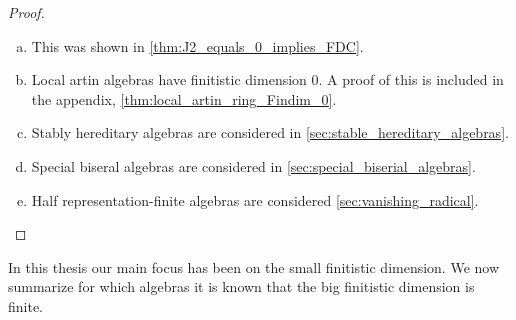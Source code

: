 \begin{theorem}
\begin{proof}
\begin{enumerate}[(a)]
			\item This was shown in \cref{thm:J2_equals_0_implies_FDC}.
			\item Local artin algebras have finitistic dimension 0. A proof of this is included in the appendix, \cref{thm:local_artin_ring_Findim_0}.
			\item Stably hereditary algebras are considered in \cref{sec:stable_hereditary_algebras}.
			\item Special biseral algebras are considered in \cref{sec:special_biserial_algebras}.
			\item Half representation-finite algebras are considered \cref{sec:vanishing_radical}.
		\end{enumerate}
	\end{proof}
\end{theorem}

In this thesis our main focus has been on the small finitistic dimension. We now summarize for which algebras it is known that the big finitistic dimension is finite.

